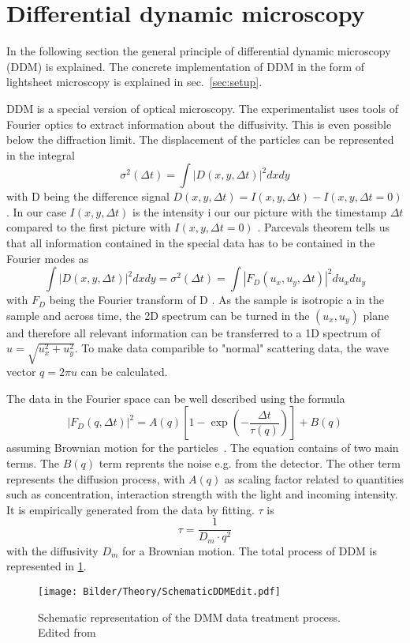 \section{Differential dynamic microscopy}
\label{sec:DDM}

In the following section the general principle of differential dynamic microscopy (DDM) is explained. The concrete implementation of DDM
in the form of lightsheet microscopy is explained in sec.~\ref{sec:setup}.

DDM is a special version of optical microscopy. The experimentalist uses tools of Fourier optics to extract information about the 
diffusivity. This is even possible below the diffraction limit. The displacement of the particles can be represented in the integral 
\begin{equation}
    \sigma^2(\Delta t) = \int |D(x,y,\Delta t)|^2 dx dy
\end{equation}
with D being the difference signal $D(x,y,\Delta t) = I(x,y,\Delta t) -I(x,y,\Delta t =0)$. In our case $I(x,y,\Delta t)$ is the intensity i our our 
picture with the timestamp $\Delta t $ compared to the first picture with $I(x,y,\Delta t = 0)$ \cite{Cerbino.2008}. Parcevals theorem tells us that all information
contained in the special data has to be contained in the Fourier modes as 
\begin{equation}
    \int |D(x,y,\Delta t)|^2 dx dy = \sigma^2(\Delta t) = \int |F_D(u_x,u_y,\Delta t)|^2 du_x du_y
\end{equation}
with $F_D$ being the Fourier transform of D \cite{Butz.2012}. As the sample is isotropic a in the sample and across time, the 2D spectrum 
can be turned in the $(u_x, u_y)$ plane and therefore all relevant information can be transferred to a 1D spectrum of $u = \sqrt{u_x^2+u_y^2}$. To make data comparible to 
"normal" scattering data, the wave vector $q = 2\pi u$ can be calculated. 

The data in the Fourier space can be well described using the formula
\begin{equation}
    |F_D(q,\Delta t)|^2 = A(q)[1- \exp(-\frac{\Delta t}{\tau (q)})] +B(q)
    \label{eq:21.3}
\end{equation}
assuming Brownian motion for the particles~\cite{Berne.2013}. The equation contains of two main terms. The $B(q)$ term reprents the 
noise e.g. from the detector. The other term represents the diffusion process, with $A(q)$ as scaling factor related to quantities such as concentration, 
interaction strength with the light and incoming intensity. It is empirically generated from the data by fitting. $\tau$ is 
\begin{equation}
    \tau = \frac{1}{D_m \cdot q^2}
    \label{eq:21.4}
\end{equation} 
with the diffusivity $D_m$ for a Brownian motion. The total process of DDM is represented in \cref{fig:DataTreatDDM}.


\begin{figure}[ht]
    \centering
    \texttt{[image: Bilder/Theory/SchematicDDMEdit.pdf]}
    \caption{Schematic representation of the DMM data treatment process. Edited from~\cite{Struntz.2017}}
    \label{fig:DataTreatDDM}
\end{figure}